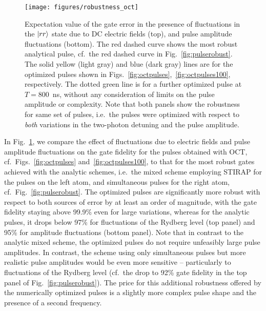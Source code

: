\begin{figure}[tb]
  \centering
  \texttt{[image: figures/robustness\_oct]}
  \caption{%
    Expectation value of the gate error in the presence of fluctuations
    in the $\Ket{rr}$ state due to DC electric fields (top), and pulse amplitude
    fluctuations (bottom). The red dashed curve shows the most robust analytical
    pulse, cf.\ the red dashed curve in Fig.~\ref{fig:pulserobust}. The solid
    yellow (light gray) and blue (dark gray) lines are for the optimized pulses shown in
    Figs.~\ref{fig:octpulses},~\ref{fig:octpulses100}, respectively. The dotted
    green line is for a further optimized pulse at $T=800$~ns, without
    any consideration of limits on the pulse amplitude or complexity.
    Note that both panels show the robustness for same set of pulses, i.e.\ the
    pulses were optimized with respect to \emph{both} variations in the
    two-photon detuning and the pulse amplitude.
    }
  \label{fig:robustoct}
\end{figure}
In Fig.~\ref{fig:robustoct}, we compare the effect of fluctuations 
due to electric fields and pulse amplitude fluctuations on
the gate fidelity for the pulses obtained with OCT, cf.\
Figs.~\ref{fig:octpulses} and~\ref{fig:octpulses100}, to that for the most
robust gates achieved with the analytic schemes, i.e.\ the
mixed scheme employing STIRAP for the pulses on the left atom, and simultaneous
pulses for the right atom, cf.\ Fig.~\ref{fig:pulserobust}.
The optimized pulses are significantly more robust with respect to both sources
of error by at least an order of magnitude, with the gate fidelity staying above
99.9\% even for large variations, whereas for the analytic pulses, it drops
below 97\% for fluctuations of the Rydberg level (top panel) and 95\% for
amplitude fluctuations (bottom panel).
Note that in contrast to the analytic mixed scheme, the optimized pulses do not
require unfeasibly large pulse amplitudes.
In contrast, the scheme using only simultaneous
pulses but more realistic pulse amplitudes would be even more sensitive --
particularly to fluctuations of the Rydberg level (cf.\ the drop to 92\% gate
fidelity in the top panel of Fig.~\ref{fig:pulserobust}). The price for
this additional robustness offered by the numerically optimized pulses
is a slightly more complex pulse shape and the 
presence of a second frequency.

